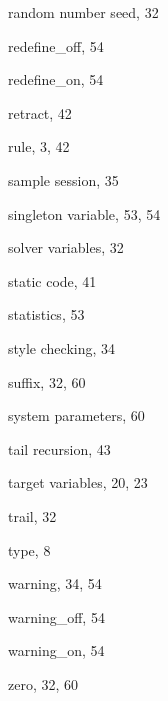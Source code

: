 \begin{theindex}
  \indexspace

  \item random number seed, 32
  \item redefine\_off, 54
  \item redefine\_on, 54
  \item retract, 42
  \item rule, 3, 42

  \indexspace

  \item sample session, 35
  \item singleton variable, 53, 54
  \item solver variables, 32
  \item static code, 41
  \item statistics, 53
  \item style checking, 34
  \item suffix, 32, 60
  \item system parameters, 60

  \indexspace

  \item tail recursion, 43
  \item target variables, 20, 23
  \item trail, 32
  \item type, 8

  \indexspace

  \item warning, 34, 54
  \item warning\_off, 54
  \item warning\_on, 54

  \indexspace

  \item zero, 32, 60

\end{theindex}
